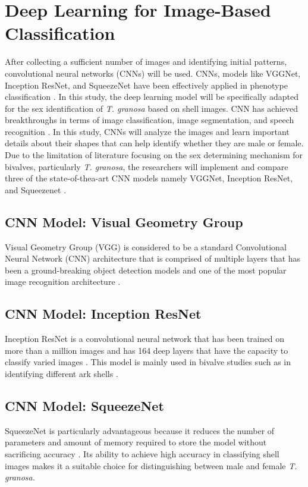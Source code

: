\section{ Deep Learning for Image-Based Classification}
\label{sec:deeplearning}
After collecting a sufficient number of images and identifying initial patterns, convolutional neural networks (CNNs) will be used. CNNs, models like VGGNet, Inception ResNet, and SqueezeNet have been effectively applied in phenotype classification \cite{kim2024}. In this study, the deep learning model will be specifically adapted for the sex identification of \textit{T. granosa} based on shell images. CNN has achieved breakthroughs in terms of image classification, image segmentation, and speech recognition \cite{he2018}. In this study, CNNs will analyze the images and learn important details about their shapes that can help identify whether they are male or female. Due to the limitation of literature focusing on the sex determining mechanism for bivalves, particularly \textit{T. granosa}, the researchers will implement and compare three of the state-of-thea-art CNN models namely VGGNet, Inception ResNet, and Squeezenet . 

\subsection{CNN Model: Visual Geometry Group}
Visual Geometry Group (VGG) is considered to be a standard Convolutional Neural Network (CNN) architecture that is comprised of multiple layers that has been a ground-breaking object detection models and one of the most popular image recognition architecture \cite{boesch2021}. 

\subsection{CNN Model: Inception ResNet}
Inception ResNet is a convolutional neural network that has been trained on more than a million images and has 164 deep layers that have the capacity to classify varied images \cite{mathworks}. This model is mainly used in bivalve studies such as in identifying different ark shells \cite{kim2024}.  

\subsection{CNN Model: SqueezeNet}
SqueezeNet is particularly advantageous because it reduces the number of parameters and amount of memory required to store the model without sacrificing accuracy \cite{koonce2021}. Its ability to achieve high accuracy in classifying shell images makes it a suitable choice for distinguishing between male and female \textit{T. granosa.}

